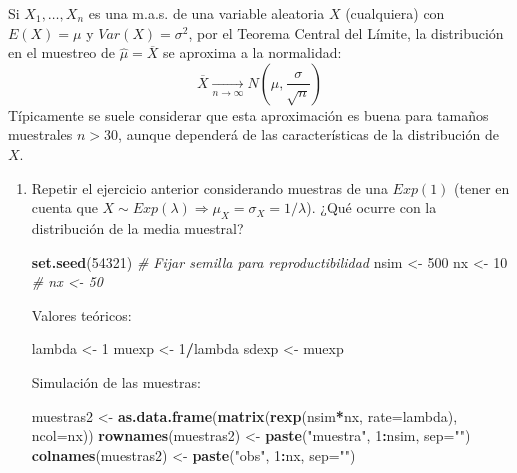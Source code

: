 \documentclass[]{book}
\newenvironment{Shaded}{\begin{snugshade}}{\end{snugshade}}
\newcommand{\KeywordTok}[1]{\textcolor[rgb]{0.13,0.29,0.53}{\textbf{#1}}}
\newcommand{\DataTypeTok}[1]{\textcolor[rgb]{0.13,0.29,0.53}{#1}}
\newcommand{\DecValTok}[1]{\textcolor[rgb]{0.00,0.00,0.81}{#1}}
\newcommand{\StringTok}[1]{\textcolor[rgb]{0.31,0.60,0.02}{#1}}
\newcommand{\CommentTok}[1]{\textcolor[rgb]{0.56,0.35,0.01}{\textit{#1}}}
\newcommand{\OperatorTok}[1]{\textcolor[rgb]{0.81,0.36,0.00}{\textbf{#1}}}
\newcommand{\NormalTok}[1]{#1}
\theoremstyle{definition}
\theoremstyle{definition}
\theoremstyle{definition}
\theoremstyle{remark}
\begin{document}
Si \(X_{1},\ldots,X_{n}\) es una m.a.s. de una variable aleatoria \(X\)
(cualquiera) con \(E\left( X \right) = \mu\) y
\(Var\left( X \right) = \sigma^{2}\), por el Teorema Central del Límite,
la distribución en el muestreo de \(\hat{\mu}=\overline{X}\) se aproxima
a la normalidad:
\[\overline{X}\underset{n\rightarrow\infty}{\longrightarrow}
N\left( \mu, \dfrac{\sigma}{\sqrt{n}}\right)\] Típicamente se suele
considerar que esta aproximación es buena para tamaños muestrales
\(n>30\), aunque dependerá de las características de la distribución de
\(X\).

\begin{enumerate}
\def\labelenumi{\alph{enumi})}
\item
  Repetir el ejercicio anterior considerando muestras de una \(Exp(1)\)
  (tener en cuenta que
  \(X\sim Exp(\lambda)\Rightarrow\mu_{X}=\sigma_{X}=1/\lambda\)). ¿Qué
  ocurre con la distribución de la media muestral?

\begin{Shaded}
\begin{Highlighting}[]
\KeywordTok{set.seed}\NormalTok{(}\DecValTok{54321}\NormalTok{) }\CommentTok{# Fijar semilla para reproductibilidad}
\NormalTok{nsim <-}\StringTok{ }\DecValTok{500}
\NormalTok{nx <-}\StringTok{ }\DecValTok{10}    
\CommentTok{# nx <- 50}
\end{Highlighting}
\end{Shaded}

  Valores teóricos:

\begin{Shaded}
\begin{Highlighting}[]
\NormalTok{lambda <-}\StringTok{ }\DecValTok{1}
\NormalTok{muexp <-}\StringTok{ }\DecValTok{1}\OperatorTok{/}\NormalTok{lambda}
\NormalTok{sdexp <-}\StringTok{ }\NormalTok{muexp}
\end{Highlighting}
\end{Shaded}

  Simulación de las muestras:

\begin{Shaded}
\begin{Highlighting}[]
\NormalTok{muestras2 <-}\StringTok{ }\KeywordTok{as.data.frame}\NormalTok{(}\KeywordTok{matrix}\NormalTok{(}\KeywordTok{rexp}\NormalTok{(nsim}\OperatorTok{*}\NormalTok{nx, }\DataTypeTok{rate=}\NormalTok{lambda), }\DataTypeTok{ncol=}\NormalTok{nx))}
\KeywordTok{rownames}\NormalTok{(muestras2) <-}\StringTok{ }\KeywordTok{paste}\NormalTok{(}\StringTok{"muestra"}\NormalTok{, }\DecValTok{1}\OperatorTok{:}\NormalTok{nsim, }\DataTypeTok{sep=}\StringTok{""}\NormalTok{)}
\KeywordTok{colnames}\NormalTok{(muestras2) <-}\StringTok{ }\KeywordTok{paste}\NormalTok{(}\StringTok{"obs"}\NormalTok{, }\DecValTok{1}\OperatorTok{:}\NormalTok{nx, }\DataTypeTok{sep=}\StringTok{""}\NormalTok{)}
\end{Highlighting}
\end{Shaded}


\end{enumerate}
\end{document}
